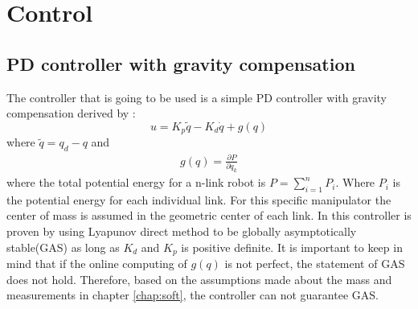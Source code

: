\section{Control}

\subsection{PD controller with gravity compensation}

The controller that is going to be used is a simple PD controller with gravity compensation derived by \cite{Siciliano,spong}:
$$
    u=K_p\tilde{q} - K_d\dot{q} +g(q)
$$
 where $\tilde{q} = q_d - q$ and 
 \begin{align}\label{eq:gravity}
 g(q) = \frac{\partial P}{\partial q_k}
 \end{align}
 where the total potential energy for a n-link robot is $P = \sum^n_{i=1}P_i$. Where $P_i$ is the potential energy for each individual link. For this specific manipulator the center of mass is assumed in the geometric center of each link. In \cite{Siciliano} this controller is proven by using Lyapunov direct method to be globally asymptotically stable(GAS) as long as $K_d$ and $K_p$ is positive definite. It is important to keep in mind that if the online computing of $g(q)$ is not perfect, the statement of GAS does not hold. Therefore, based on the assumptions made about the mass and measurements in chapter \ref{chap:soft}, the controller can not guarantee GAS. 
 
